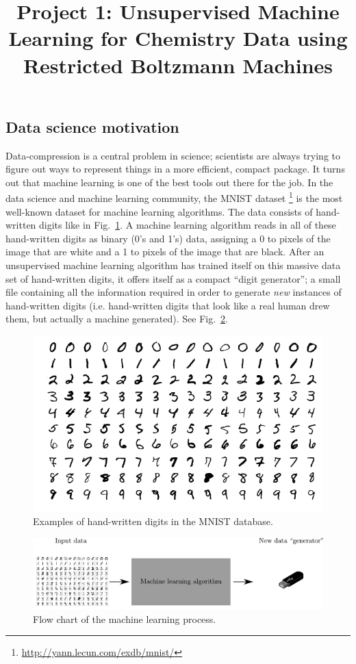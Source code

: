 \documentclass[12pt]{article}
\title{Project 1: Unsupervised Machine Learning for Chemistry Data using Restricted Boltzmann Machines}
\date{}
\begin{document}
\maketitle

\subsection*{Data science motivation}

Data-compression is a central problem in science; scientists are always trying to figure out ways to represent things in a more efficient, compact package. 
It turns out that machine learning is one of the best tools out there for the job.
In the data science and machine learning community, the MNIST dataset
\footnote{ \href{http://yann.lecun.com/exdb/mnist/}{http://yann.lecun.com/exdb/mnist/}}
is the most well-known dataset for machine learning algorithms. 
The data consists of hand-written digits like in Fig.~\ref{fig:MNIST_digits}. 
A machine learning algorithm reads in all of these hand-written digits as binary (0's and 1's) data, assigning a 0 to pixels of the image that are white and a 1 to pixels of the image that are black. 
After an unsupervised machine learning algorithm has trained itself on this massive data set of hand-written digits, it offers itself as a compact ``digit generator''; a small file containing all the information required in order to generate \textit{new} instances of hand-written digits (i.e. hand-written digits that look like a real human drew them, but actually a machine generated). See Fig.~\ref{fig:MNIST_ML}. 

\begin{figure}
    \begin{center}
        \includegraphics[width=0.5\linewidth]{../figures/MnistExamples.png}
    \end{center}
    \caption{Examples of hand-written digits in the MNIST database.}
    \label{fig:MNIST_digits}
\end{figure}

\begin{figure}
    \begin{center}
        \includegraphics[width=\linewidth]{../figures/MNIST_ML.pdf}
    \end{center}
    \caption{Flow chart of the machine learning process.}
    \label{fig:MNIST_ML}
\end{figure}
\end{document}
